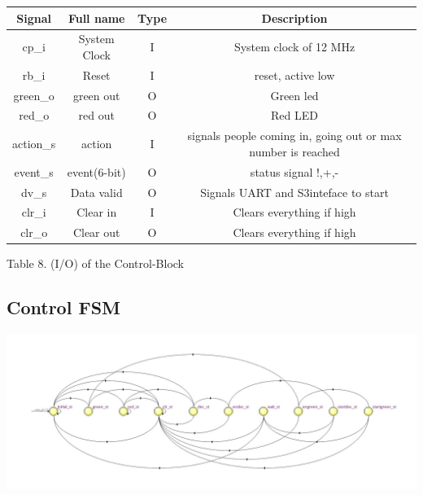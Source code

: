 \documentclass{article}
\begin{document}
\vspace{0.5cm}
 \begin{center}
           \begin{tabular}{|c|c|c|c|}
         \hline
        Signal & Full name & Type & Description \\
        \hline
        \hline
        cp\_i & System Clock & I &System clock of 12 MHz \\ 
        \hline
        rb\_i & Reset & I & reset, active low \\
        \hline 
    
        green\_o & green out  & O &  Green led \\
        \hline
        red\_o & red out   & O & Red LED \\
        \hline
        action\_s &  action & I& signals people coming in, going out or max number is reached\\
        \hline
        event\_s &  event(6-bit) & O &  status signal !,+,- \\
        \hline
        dv\_s  &  Data valid  & O & Signals UART and S3inteface to start\\
        \hline
        clr\_i  &Clear in & I & Clears everything if high \\
        \hline
        clr\_o  & Clear out & O & Clears everything if high \\ 
        \hline
          \end{tabular}
       
\end{center}
   \vspace{0.25cm}
      Table 8. (I/O) of the Control-Block
\newpage

\subsection{Control FSM}
\begin{center}

\includegraphics[width=15cm]{controlfsm.jpg}
\end{center}
\end{document}
